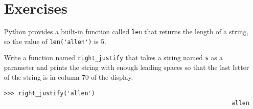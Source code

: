 \documentclass[10pt]{book}
\begin{document}
\section{Exercises}

\begin{ex}


Python provides a built-in function called {\tt len} that
returns the length of a string, so the value of \verb"len('allen')" is 5.

Write a function named \verb"right_justify" that takes a string
named {\tt s} as a parameter and prints the string with enough
leading spaces so that the last letter of the string is in column 70
of the display.

\beforeverb
\begin{verbatim}
>>> right_justify('allen')
                                                                 allen
\end{verbatim}
\afterverb

\end{ex}
\end{document}

